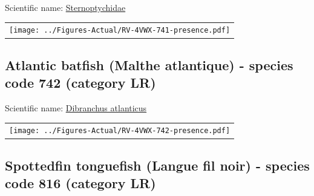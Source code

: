 \documentclass[12pt]{article}\usepackage[]{graphicx}\usepackage[]{color}
\begin{document}
  


Scientific name: \href{http://www.marinespecies.org/aphia.php?p=taxdetails\&id=125603}{Sternoptychidae} \newline
\begin{minipage}{1.0\textwidth}
 \begin{tabular}{c}
\texttt{[image: ../Figures-Actual/RV-4VWX-741-presence.pdf]} \\ 
\end{tabular} 
\end{minipage}
\clearpage

\renewcommand\thefigure{\thesubsection\Alph{figure}}

\setcounter{figure}{0}

\hypertarget{sec:742}{%
\subsection{Atlantic batfish (Malthe atlantique) - species code 742 (category LR)}\label{sec:742}}

  


Scientific name: \href{http://www.marinespecies.org/aphia.php?p=taxdetails\&id=126558}{Dibranchus atlanticus} \newline
\begin{minipage}{1.0\textwidth}
 \begin{tabular}{c}
\texttt{[image: ../Figures-Actual/RV-4VWX-742-presence.pdf]} \\ 
\end{tabular} 
\end{minipage}
\clearpage

\renewcommand\thefigure{\thesubsection\Alph{figure}}

\setcounter{figure}{0}

\hypertarget{sec:816}{%
\subsection{Spottedfin tonguefish (Langue fil noir) - species code 816 (category LR)}\label{sec:816}}

  
\end{document}
